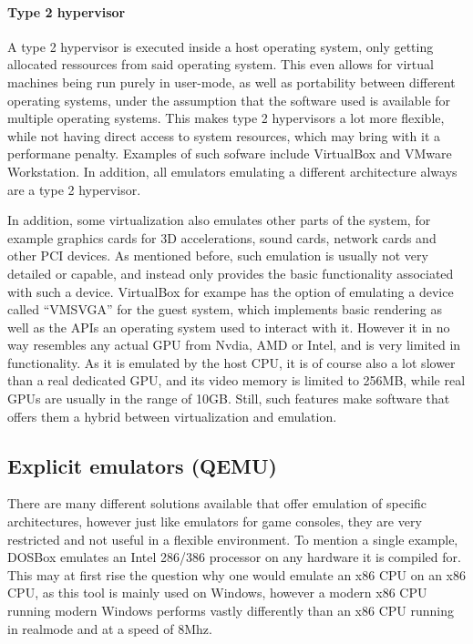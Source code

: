 \paragraph{Type 2 hypervisor} A type 2 hypervisor is executed inside a host operating system,
only getting allocated ressources from said operating system.
This even allows for virtual machines being run purely in user-mode,
as well as portability between different operating systems,
under the assumption that the software used is available for multiple operating systems.
This makes type 2 hypervisors a lot more flexible,
while not having direct access to system resources,
which may bring with it a performane penalty.
Examples of such sofware include VirtualBox and VMware Workstation\cite{hypervisor}.
In addition, all emulators emulating a different architecture always are a type 2 hypervisor.

In addition, some virtualization also emulates other parts of the system,
for example graphics cards for 3D accelerations, sound cards, network cards
and other PCI devices.
As mentioned before, such emulation is usually not very detailed or capable,
and instead only provides the basic functionality associated with such a device.
VirtualBox for exampe has the option of emulating a device called \enquote{VMSVGA}
for the guest system, which implements basic rendering as well as the APIs
an operating system used to interact with it.
However it in no way resembles any actual GPU from Nvdia, AMD or Intel,
and is very limited in functionality.
As it is emulated by the host CPU, it is of course also a lot slower than a real dedicated GPU,
and its video memory is limited to 256MB, while real GPUs are usually in the range of 10GB.
Still, such features make software that offers them a hybrid between virtualization and emulation.

\subsection{Explicit emulators (QEMU)}
There are many different solutions available that offer emulation of specific architectures,
however just like emulators for game consoles, they are very restricted and not useful in a flexible environment.
To mention a single example, DOSBox emulates an Intel 286/386 processor on any hardware it is compiled for.
This may at first rise the question why one would emulate an x86 CPU on an x86 CPU,
as this tool is mainly used on Windows,
however a modern x86 CPU running modern Windows performs vastly differently than
an x86 CPU running in realmode and at a speed of 8Mhz.

